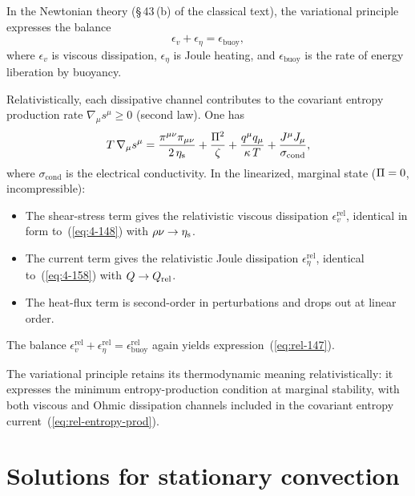 In the Newtonian theory (\S\,43\,(b) of the classical text), the
variational principle expresses the balance
\begin{equation}
  \epsilon_{v}+\epsilon_{\eta} = \epsilon_{\text{buoy}},
\end{equation}
where $\epsilon_{v}$ is viscous dissipation, $\epsilon_{\eta}$ is
Joule heating, and $\epsilon_{\text{buoy}}$ is the rate of energy
liberation by buoyancy.

Relativistically, each dissipative channel contributes to the
covariant entropy production rate
$\nabla_{\mu}s^{\mu}\ge 0$ (second law).  One has
\begin{equation}\label{eq:rel-entropy-prod}
  T\,\nabla_{\mu}s^{\mu}
  = \frac{\pi^{\mu\nu}\pi_{\mu\nu}}{2\,\eta_{\mathrm{s}}}
    + \frac{\Pi^{2}}{\zeta}
    + \frac{q^{\mu}q_{\mu}}{\kappa\,T}
    + \frac{J^{\mu}J_{\mu}}{\sigma_{\text{cond}}},
\end{equation}
where $\sigma_{\text{cond}}$ is the electrical conductivity.
In the linearized, marginal state ($\Pi=0$, incompressible):
\begin{itemize}
  \item The shear-stress term gives the relativistic viscous
    dissipation $\epsilon_{v}^{\text{rel}}$, identical in form
    to~(\ref{eq:4-148}) with $\rho\nu\to\eta_{\mathrm{s}}$.
  \item The current term gives the relativistic Joule dissipation
    $\epsilon_{\eta}^{\text{rel}}$, identical to~(\ref{eq:4-158})
    with $Q\to Q_{\mathrm{rel}}$.
  \item The heat-flux term is second-order in perturbations
    and drops out at linear order.
\end{itemize}
The balance $\epsilon_{v}^{\text{rel}}+\epsilon_{\eta}^{\text{rel}}
=\epsilon_{\text{buoy}}^{\text{rel}}$ again yields
expression~(\ref{eq:rel-147}).

\begin{relcorrection}
The variational principle retains its thermodynamic meaning
relativistically: it expresses the minimum entropy-production
condition at marginal stability, with both viscous and Ohmic
dissipation channels included in the covariant entropy
current~(\ref{eq:rel-entropy-prod}).
\end{relcorrection}

\section{Solutions for stationary convection}
\label{sec:rel-44}

